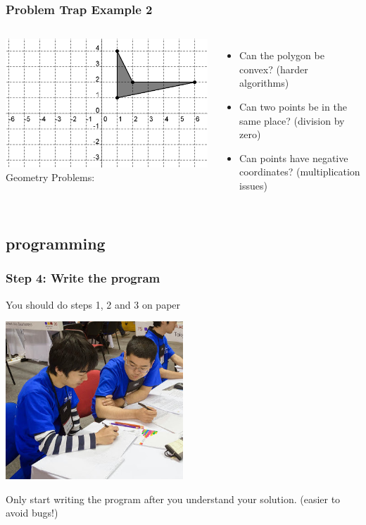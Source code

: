 \documentclass{beamer}
\begin{document}
\begin{frame}
  \frametitle{Problem Trap Example 2}
  \begin{columns}[T]
    \includegraphics[width=1\textwidth]{img/polygon}    
    Geometry Problems:
    \begin{itemize}
    \item Can the polygon be convex? (harder algorithms)
      \vspace{.5cm}

    \item Can two points be in the same place? (division by zero)
      \vspace{.5cm}

    \item Can points have negative coordinates? (multiplication issues)
    \end{itemize}
  \end{columns}
\end{frame}


\subsection{programming}

\begin{frame}
  \frametitle{Step 4: Write the program}

  You should do steps 1, 2 and 3 \alert{on paper}
  \medskip
  \begin{center}
  \includegraphics[width=0.5\textwidth]{img/writing}
  \end{center}
  \medskip
  Only start writing the program after you understand your
  solution. (easier to avoid bugs!)
\end{frame}
\end{document}

